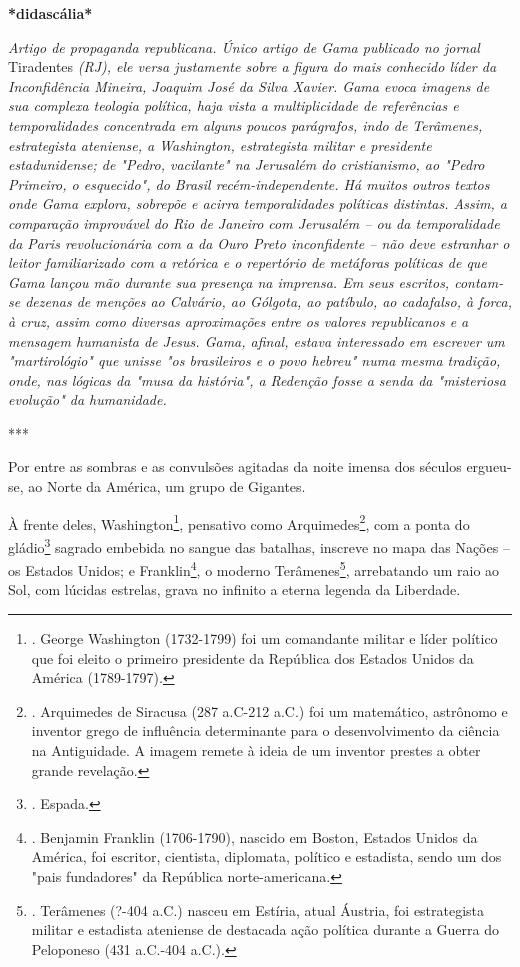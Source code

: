 \textbf{*didascália*}

\emph{Artigo de propaganda republicana. Único artigo de Gama publicado
no jornal} Tiradentes \emph{(RJ), ele versa justamente sobre a figura do
mais conhecido líder da Inconfidência Mineira, Joaquim José da Silva
Xavier. Gama evoca imagens de sua complexa teologia política, haja vista
a multiplicidade de referências e temporalidades concentrada em alguns
poucos parágrafos, indo de Terâmenes, estrategista ateniense, a
Washington, estrategista militar e presidente estadunidense; de "Pedro,
vacilante" na Jerusalém do cristianismo, ao "Pedro Primeiro, o
esquecido", do Brasil recém-independente. Há muitos outros textos onde
Gama explora, sobrepõe e acirra temporalidades políticas distintas.
Assim, a comparação improvável do Rio de Janeiro com Jerusalém -- ou da
temporalidade da Paris revolucionária com a da Ouro Preto inconfidente
-- não deve estranhar o leitor familiarizado com a retórica e o
repertório de metáforas políticas de que Gama lançou mão durante sua
presença na imprensa. Em seus escritos, contam-se dezenas de menções ao
Calvário, ao Gólgota, ao patíbulo, ao cadafalso, à forca, à cruz, assim
como diversas aproximações entre os valores republicanos e a mensagem
humanista de Jesus. Gama, afinal, estava interessado em escrever um
"martirológio" que unisse "os brasileiros e o povo hebreu" numa mesma
tradição, onde, nas lógicas da "musa da história", a Redenção fosse a
senda da "misteriosa evolução" da humanidade. }

***

Por entre as sombras e as convulsões agitadas da noite imensa dos
séculos ergueu-se, ao Norte da América, um grupo de Gigantes.

À frente deles, Washington\footnote{. George Washington (1732-1799) foi
  um comandante militar e líder político que foi eleito o primeiro
  presidente da República dos Estados Unidos da América (1789-1797).},
pensativo como Arquimedes\footnote{. Arquimedes de Siracusa (287 a.C-212
  a.C.) foi um matemático, astrônomo e inventor grego de influência
  determinante para o desenvolvimento da ciência na Antiguidade. A
  imagem remete à ideia de um inventor prestes a obter grande revelação.},
com a ponta do gládio\footnote{. Espada.} sagrado embebida no sangue das
batalhas, inscreve no mapa das Nações -- os Estados Unidos; e
Franklin\footnote{. Benjamin Franklin (1706-1790), nascido em Boston,
  Estados Unidos da América, foi escritor, cientista, diplomata,
  político e estadista, sendo um dos "pais fundadores" da República
  norte-americana.}, o moderno Terâmenes\footnote{. Terâmenes (?-404
  a.C.) nasceu em Estíria, atual Áustria, foi estrategista militar e
  estadista ateniense de destacada ação política durante a Guerra do
  Peloponeso (431 a.C.-404 a.C.).}, arrebatando um raio ao Sol, com
lúcidas estrelas, grava no infinito a eterna legenda da Liberdade.

